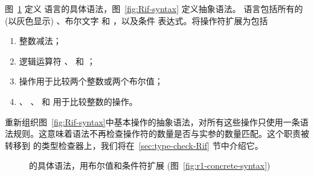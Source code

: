 \documentclass[11pt]{book}
\newcommand{\gray}[1]{{\color{gray} #1}}
\begin{document}
图~\ref{fig:Rif-concrete-syntax} 定义 \LangIf{} 语言的具体语法，图~\ref{fig:Rif-syntax} 定义抽象语法。 \LangIf{} 语言包括所有的
\LangVar{} (以灰色显示) 、布尔文字  和
 ，以及条件  表达式。将操作符扩展为包括
\begin{enumerate}
\item 整数减法；
\item 逻辑运算符  、 和  ；
\item  {} 操作用于比较两个整数或两个布尔值；
\item  \key{<} 、\key{<=} 、\key{>} 和 \key{>=} 用于比较整数的操作。
\end{enumerate}
重新组织图~\ref{fig:Rif-syntax}中基本操作的抽象语法，对所有这些操作只使用一条语法规则。这意味着语法不再检查操作符的数量是否与实参的数量匹配。这个职责被转移到 \LangIf{} 的类型检查器上，我们将在~\ref{sec:type-check-Rif} 节中介绍它。

\begin{figure}[tp]
\centering
\fbox{
\begin{minipage}{0.96\textwidth}
\[
\begin{array}{lcl}
  \itm{bool} &::=& \key{\#t} \mid \key{\#f} \\  
  \itm{cmp} &::= & \key{eq?} \mid \key{<} \mid \key{<=} \mid \key{>} \mid \key{>=} \\
  \Exp &::=& \gray{ \Int \mid \CREAD{} \mid \CNEG{\Exp} \mid \CADD{\Exp}{\Exp} }  \mid \CSUB{\Exp}{\Exp} \\
     &\mid&  \gray{ \Var \mid \CLET{\Var}{\Exp}{\Exp} } \\
     &\mid& \itm{bool}
      \mid (\key{and}\;\Exp\;\Exp) \mid (\key{or}\;\Exp\;\Exp)
      \mid (\key{not}\;\Exp) \\
      &\mid& (\itm{cmp}\;\Exp\;\Exp) \mid \CIF{\Exp}{\Exp}{\Exp} \\
  \LangIf{} &::=& \Exp
\end{array}
\]
\end{minipage}
}
\caption{ \LangIf{} 的具体语法，用布尔值和条件符扩展 \LangVar{}
  (图~\ref{fig:r1-concrete-syntax}) }
\label{fig:Rif-concrete-syntax}
\end{figure}
\end{document}
